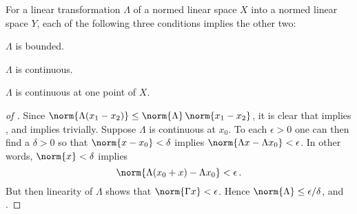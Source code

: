 \documentclass[12pt, ThmSectionNumbering]{CrispyNotes}
\begin{document}
\begin{theorem}\label{theorem2}
    For a linear transformation $\Lambda$ of a normed linear space $X$ into a normed linear space $Y$, each of the following three conditions implies the other two:
    \begin{thmitems}
        \item\label{theorem2:a}
            $\Lambda$ is bounded.

        \item\label{theorem2:b}
            $\Lambda$ is continuous.

        \item\label{theorem2:c}
            $\Lambda$ is continuous at one point of $X$.
    \end{thmitems}
\end{theorem}
\begin{proof}[of {}]
    Since $\norm{\Lambda(x_1-x_2)} \leq \norm{\Lambda}\,\norm{x_1-x_2}$, it is clear that  implies , and  implies  trivially. Suppose $\Lambda$ is continuous at $x_0$. To each $\epsilon>0$ one can then find a $\delta>0$ so that $\norm{x-x_0}<\delta$ implies $\norm{\Lambda x - \Lambda x_0}<\epsilon$. In other words, $\norm{x}<\delta$ implies
        \begin{equation*}
            \norm{\Lambda(x_0+x)-\Lambda x_0} <\epsilon\mathp
        \end{equation*}
    But then linearity of $\Lambda$ shows that $\norm{\Gamma x}<\epsilon$. Hence $\norm{\Lambda}\leq \epsilon\slash\delta$, and .
\end{proof}
\end{document}
